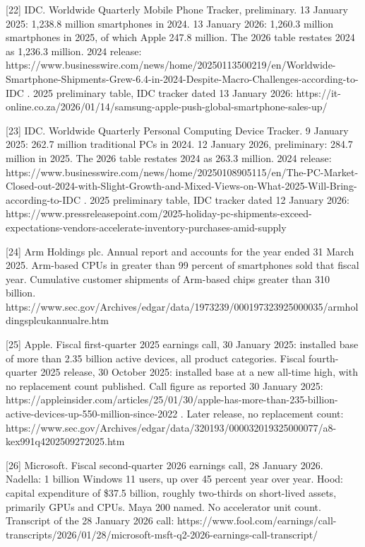 \documentclass[
  10pt,
]{article}
\begin{document}
{[}22{]} IDC. Worldwide Quarterly Mobile Phone Tracker, preliminary. 13
January 2025: 1,238.8 million smartphones in 2024. 13 January 2026:
1,260.3 million smartphones in 2025, of which Apple 247.8 million. The
2026 table restates 2024 as 1,236.3 million. 2024 release:
https://www.businesswire.com/news/home/20250113500219/en/Worldwide-Smartphone-Shipments-Grew-6.4-in-2024-Despite-Macro-Challenges-according-to-IDC
. 2025 preliminary table, IDC tracker dated 13 January 2026:
https://it-online.co.za/2026/01/14/samsung-apple-push-global-smartphone-sales-up/

{[}23{]} IDC. Worldwide Quarterly Personal Computing Device Tracker. 9
January 2025: 262.7 million traditional PCs in 2024. 12 January 2026,
preliminary: 284.7 million in 2025. The 2026 table restates 2024 as
263.3 million. 2024 release:
https://www.businesswire.com/news/home/20250108905115/en/The-PC-Market-Closed-out-2024-with-Slight-Growth-and-Mixed-Views-on-What-2025-Will-Bring-according-to-IDC
. 2025 preliminary table, IDC tracker dated 12 January 2026:
https://www.pressreleasepoint.com/2025-holiday-pc-shipments-exceed-expectations-vendors-accelerate-inventory-purchases-amid-supply

{[}24{]} Arm Holdings plc. Annual report and accounts for the year ended
31 March 2025. Arm-based CPUs in greater than 99 percent of smartphones
sold that fiscal year. Cumulative customer shipments of Arm-based chips
greater than 310 billion.
https://www.sec.gov/Archives/edgar/data/1973239/000197323925000035/armholdingsplcukannualre.htm

{[}25{]} Apple. Fiscal first-quarter 2025 earnings call, 30 January
2025: installed base of more than 2.35 billion active devices, all
product categories. Fiscal fourth-quarter 2025 release, 30 October 2025:
installed base at a new all-time high, with no replacement count
published. Call figure as reported 30 January 2025:
https://appleinsider.com/articles/25/01/30/apple-has-more-than-235-billion-active-devices-up-550-million-since-2022
. Later release, no replacement count:
https://www.sec.gov/Archives/edgar/data/320193/000032019325000077/a8-kex991q4202509272025.htm

{[}26{]} Microsoft. Fiscal second-quarter 2026 earnings call, 28 January
2026. Nadella: 1 billion Windows 11 users, up over 45 percent year over
year. Hood: capital expenditure of \$37.5 billion, roughly two-thirds on
short-lived assets, primarily GPUs and CPUs. Maya 200 named. No
accelerator unit count. Transcript of the 28 January 2026 call:
https://www.fool.com/earnings/call-transcripts/2026/01/28/microsoft-msft-q2-2026-earnings-call-transcript/
\end{document}
